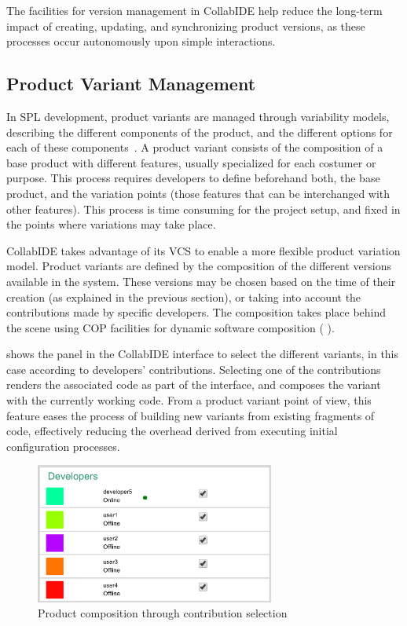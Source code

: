 The facilities for version management in CollabIDE help reduce the long-term impact of creating, 
updating, and synchronizing product versions, as these processes occur autonomously upon simple 
interactions.

\subsection{Product Variant Management}
\label{sec:product-variant}
In \ac{SPL} development, product variants are managed through variability models, describing the 
different components of the product, and the different options for each of these 
components~\cite{pohl05}. A product variant consists of the composition of a base product with 
different features, usually specialized for each costumer or purpose. This process requires developers 
to define beforehand both, the base product, and the variation points (\ie those features that can be 
interchanged with other features). This process is time consuming for the project setup, and fixed in 
the points where variations may take place.

CollabIDE takes advantage of its \ac{VCS} to enable a more flexible product variation model. Product 
variants are defined by the composition of the different versions available in the system. These 
versions may be chosen based on the time of their creation (as explained in the previous section), or 
taking into account the contributions made by specific developers. The composition takes place 
behind the scene using \ac{COP} facilities for dynamic software composition (\cf 
{}).

 shows the panel in the CollabIDE interface to select the different variants, in this 
case according to developers' contributions. Selecting one of the contributions renders the associated 
code as part of the interface, and composes the variant with the currently working code. From a 
product variant point of view, this feature eases the process of building new variants from existing 
fragments of code, effectively reducing the overhead derived from executing initial configuration 
processes.

\begin{figure}[htbp]
  \centering
  \includegraphics[width=0.7\textwidth]{img/fig3-collabIDEContributionManagement}
  \caption{Product composition through contribution selection}
  \label{fig:contribution}
\end{figure}


